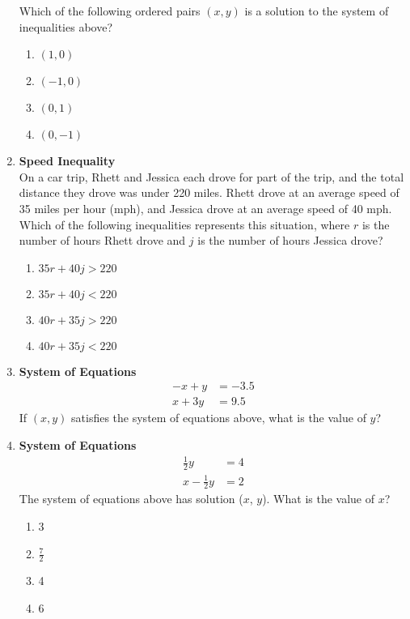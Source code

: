 \begin{enumerate}
Which of the following ordered pairs $(x, y)$ is a solution to the system of inequalities above?
\begin{enumerate}[label=(\Alph*)]
  \item $(1,0)$
  \item $(-1,0)$
  \item $(0,1)$
  \item $(0,-1)$
\end{enumerate}
\begin{subanswer}
\end{subanswer}

\item \textbf{Speed Inequality}\\
On a car trip, Rhett and Jessica each drove for part of the trip, and the total distance they drove was under 220 miles. Rhett drove at an average speed of 35 miles per hour (mph), and Jessica drove at an average speed of 40 mph. Which of the following inequalities represents this situation, where $r$ is the number of hours Rhett drove and $j$ is the number of hours Jessica drove?
\begin{enumerate}[label=(\Alph*)]
  \item $35r + 40j > 220$
  \item $35r + 40j < 220$
  \item $40r + 35j > 220$
  \item $40r + 35j < 220$
\end{enumerate}
\begin{subanswer}
\end{subanswer}

\item \textbf{System of Equations}\\
\begin{align*}
  -x + y &= -3.5 \\
  x + 3y &= 9.5
\end{align*}
If $(x, y)$ satisfies the system of equations above, what is the value of $y$?
\begin{subanswer}
\end{subanswer}

\item \textbf{System of Equations}\\
\[
\begin{aligned}
\frac{1}{2}y &= 4 \\
x - \frac{1}{2}y &= 2
\end{aligned}
\]
The system of equations above has solution ($x$, $y$). What is the value of $x$?
\begin{enumerate}[label=(\Alph*)]
  \item 3
  \item $\frac{7}{2}$
  \item 4
  \item 6
\end{enumerate}
\begin{subanswer}
\end{subanswer}



\end{enumerate}
